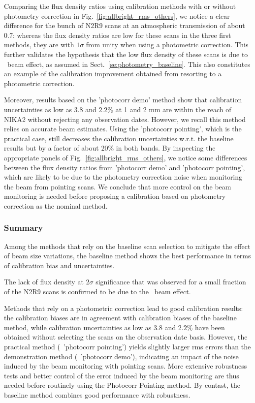 Comparing the flux density ratios using calibration methods with or
without photometry correction in Fig.~\ref{fig:allbright_rms_others},
we notice a clear difference for the bunch of N2R9 scans at an
atmospheric transmission of about 0.7: whereas the flux density ratios
are low for these scans in the three first methods, they are with
$1\sigma$ from unity when using a photometric correction. This further
validates the hypothesis that the low flux density of these scans is due to
\afternoon\ beam effect, as assumed in
Sect.~\ref{se:photometry_baseline}. This also constitutes an example
of the calibration improvement obtained from resorting to a
photometric correction.

Moreover, results based on the 'photocorr demo' method show that calibration
uncertainties as low as $3.8$ and $2.2\%$
at 1 and 2 mm are within the reach of NIKA2 without rejecting any
observation dates. However, we recall this method relies on 
accurate beam estimates. Using the 'photocorr pointing', which is the
practical case, still decreases the calibration uncertainties
w.r.t. the baseline results but by a factor of about $20\%$ in both
bands. By inspecting the appropriate panels of
Fig.~\ref{fig:allbright_rms_others}, we notice some differences between
the flux density ratios from 'photocorr demo' and 'photocorr
pointing', which are likely to be due to the photometry correction noise
when monitoring the beam from pointing scans. We conclude that more
control on the beam monitoring is needed before proposing a calibration
based on photometry correction as the nominal method.


\subsubsection{Summary}

Among the methods that rely on the baseline scan selection to
mitigate the effect of beam size variations, the baseline method shows
the best performance in terms of calibration bias and uncertainties.

The lack of flux density at $2\sigma$ significance that was observed
for a small fraction of the N2R9 scans is confirmed to be due to the
\afternoon\ beam effect.

Methods that rely on a photometric correction lead to good calibration
results: the calibration biases are in agreement with calibration
biases of the baseline method, while calibration uncertainties as low
as $3.8$ and $2.2\%$ have been obtained without selecting the scans on
the observation date basis. However, the practical method
(\aka\ 'photocorr pointing') yields slightly larger rms errors than
the demonstration method (\aka\ 'photocorr demo'), indicating an
impact of the noise induced by the beam monitoring with pointing
scans. More extensive robustness tests and better control of the error
induced by the beam monitoring are thus needed before routinely using
the Photocorr Pointing method.
By contast, the baseline method combines good performance with robustness.    








